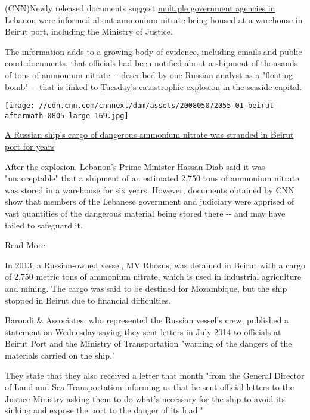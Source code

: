(CNN)Newly released documents suggest
\href{https://cnn.com/2020/08/05/europe/lebanon-russian-ship-blast-intl/index.html}{multiple
government agencies in Lebanon} were informed about ammonium nitrate
being housed at a warehouse in Beirut port, including the Ministry of
Justice.

The information adds to a growing body of evidence, including emails and
public court documents, that officials had been notified about a
shipment of thousands of tons of ammonium nitrate -\/- described by one
Russian analyst as a "floating bomb" -\/- that is linked to
\href{https://cnn.com/2020/08/06/middleeast/beirut-explosion-anger-intl-hnk/index.html}{Tuesday's
catastrophic explosion} in the seaside capital.

\href{/2020/08/05/europe/lebanon-russian-ship-blast-intl/index.html}{}

\texttt{[image: //cdn.cnn.com/cnnnext/dam/assets/200805072055-01-beirut-aftermath-0805-large-169.jpg]}

\href{/2020/08/05/europe/lebanon-russian-ship-blast-intl/index.html}{A
Russian ship's cargo of dangerous ammonium nitrate was stranded in
Beirut port for years}

After the explosion, Lebanon's Prime Minister Hassan Diab said it was
"unacceptable" that a shipment of an estimated 2,750 tons of ammonium
nitrate was stored in a warehouse for six years. However, documents
obtained by CNN show that members of the Lebanese government and
judiciary were apprised of vast quantities of the dangerous material
being stored there -\/- and may have failed to safeguard it.

Read More

In 2013, a Russian-owned vessel, MV Rhosus, was detained in Beirut with
a cargo of 2,750 metric tons of ammonium nitrate, which is used in
industrial agriculture and mining. The cargo was said to be destined for
Mozambique, but the ship stopped in Beirut due to financial
difficulties.

Baroudi \& Associates, who represented the Russian vessel's crew,
published a statement on Wednesday saying they sent letters in July 2014
to officials at Beirut Port and the Ministry of Transportation "warning
of the dangers of the materials carried on the ship."

They state that they also received a letter that month "from the General
Director of Land and Sea Transportation informing us that he sent
official letters to the Justice Ministry asking them to do what's
necessary for the ship to avoid its sinking and expose the port to the
danger of its load."

